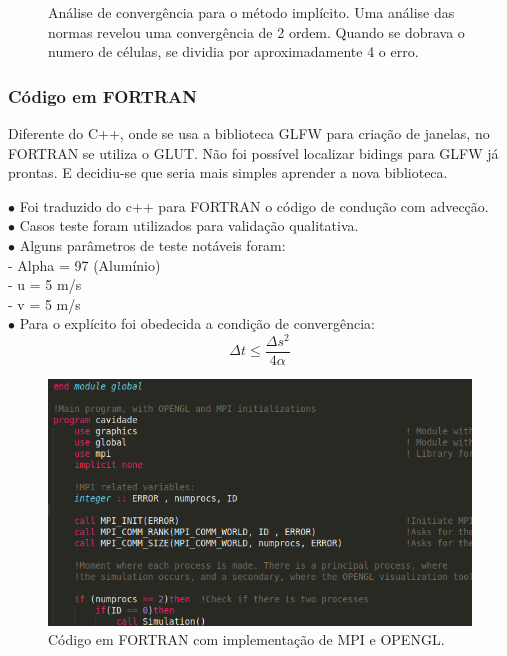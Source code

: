 \documentclass[xcolor=dvipsnames,10pt,aspectratio=169]{beamer}
\begin{document}
\begin{frame}
\begin{minipage}[h!]{0.49\textwidth}
\begin{figure}[h!]
				\caption{ Análise de convergência para o método implícito. Uma análise das normas revelou uma convergência de 2 ordem. Quando se dobrava o numero de células, se dividia por aproximadamente 4 o erro.}
			\end{figure}
		\end{minipage}
	\end{frame}





	\begin{frame} 
		\frametitle{Código em FORTRAN}
		\begin{minipage}[h!]{0.49\textwidth}
			
			Diferente do C++, onde se usa a biblioteca GLFW para criação de janelas, no FORTRAN se utiliza o GLUT. Não foi possível localizar bidings para GLFW já prontas. E decidiu-se que seria mais simples aprender a nova biblioteca.
			
			$\bullet$ Foi traduzido do c++ para FORTRAN o código de condução com advecção.\\
			$\bullet$ Casos teste foram utilizados para validação qualitativa.\\
			$\bullet$ Alguns parâmetros de teste notáveis foram: \\
			- Alpha = 97 (Alumínio) \\
			- u = 5 m/s \\
			- v = 5 m/s \\
			$\bullet$ Para o explícito foi obedecida a condição de convergência:
			\begin{equation}
			\Delta t \leq \frac{\Delta s ^2}{4 \alpha} 
			\end{equation}
		\end{minipage}
		\begin{minipage}[h!]{0.49\textwidth}
			\begin{figure}[h!]
				\centering
				\includegraphics[trim = {0cm 1cm 5cm 1cm}, clip , angle=0, scale=0.45]{images/fortran_code}
				\caption{Código em FORTRAN com implementação de MPI e OPENGL.}
			\end{figure}
		\end{minipage}
	\end{frame}
\end{document}
